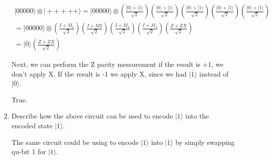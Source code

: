 \documentclass{article}
\renewcommand{\ket}[1]{| #1 \rangle}
\begin{document}
\begin{enumerate}
\begin{enumerate}
    \begin{gather*}
      \ket{00000} \otimes \ket{+++++} = \ket{00000} \otimes (\frac{\ket{0} + \ket{1}}{\sqrt{2}})(\frac{\ket{0} + \ket{1}}{\sqrt{2}})(\frac{\ket{0} + \ket{1}}{\sqrt{2}})(\frac{\ket{0} + \ket{1}}{\sqrt{2}})(\frac{\ket{0} + \ket{1}}{\sqrt{2}})\\
      = \ket{00000} \otimes (\frac{I + M_1}{\sqrt{2}})(\frac{I + M2}{\sqrt{2}})(\frac{I + M_3}{\sqrt{2}})(\frac{I + M_4}{\sqrt{2}})(\frac{Z + ZX}{\sqrt{2}})\\
      = \ket{\overline{0}}(\frac{Z+ZX}{\sqrt{2}})
    \end{gather*}

    Next, we can perform the Z parity messurement if the result is +1, we don't apply X. If the result is -1 we apply X, since we had $\ket{\overline{1}}$ instead of $\ket{\overline{0}}$.

    True.

	\item Describe how the above circuit can be used to encode $\ket{1}$ into the encoded state $\ket{\overline{1}}$.

    The same circuit could be using to encode $\ket{1}$ into $\ket{\overline{1}}$ by simply swapping qu-bit 1 for $\ket{1}$.
	\end{enumerate}

\end{enumerate}
 
\end{document}
